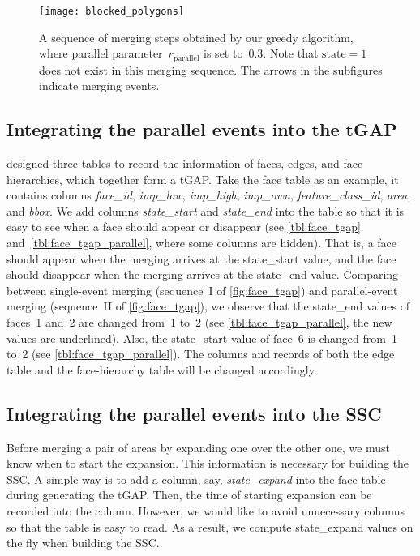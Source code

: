 \documentclass[ijgi,article,submit,moreauthors,pdftex]{Definitions/mdpi}
\begin{document}
\begin{figure}[tb]
\centering
\texttt{[image: blocked\_polygons]}
\caption{A sequence of merging steps obtained by our greedy algorithm,
	where parallel parameter~$r_\mathrm{parallel}$ is set to~$0.3$.
    Note that $\mathrm{state}=1$ does not exist in this merging sequence.
	The arrows in the subfigures indicate merging events.
}
\label{fig:sequence_greedy}
\end{figure}




\subsection{Integrating the parallel events into the tGAP}

\citet[]{Meijers2011Thesis} designed three tables 
to record the information of
faces, edges, and face hierarchies, 
which together form a tGAP.
Take the face table as an example,
it contains columns \emph{face\_id}, 
\emph{imp\_low}, \emph{imp\_high}, \emph{imp\_own},
\emph{feature\_class\_id}, \emph{area}, and \emph{bbox}.
We add columns \emph{state\_start} and \emph{state\_end} into the table 
so that it is easy to see when a face should appear or disappear 
(see \tbls\ref{tbl:face_tgap} and~\ref{tbl:face_tgap_parallel},
where some columns are hidden).
That is, a face should appear
when the merging arrives at the state\_start value,
and the face should disappear
when the merging arrives at the state\_end value.
Comparing between single-event merging 
(sequence~I of \fig\ref{fig:face_tgap})
and parallel-event merging (sequence~II of \fig\ref{fig:face_tgap}),
we observe that the state\_end values of faces~1 and~2 are changed from~1 to~2
(see \tbl\ref{tbl:face_tgap_parallel}, the new values are underlined).
Also, the state\_start value of face~6 is changed from~1 to~2
(see \tbl\ref{tbl:face_tgap_parallel}).
The columns and records of both the edge table and the face-hierarchy table 
will be changed accordingly.


\subsection{Integrating the parallel events into the SSC}

Before merging a pair of areas by expanding one over the other one,
we must know when to start the expansion.
This information is necessary for building the SSC.
A simple way is to add a column, say, \emph{state\_expand} 
into the face table during generating the tGAP.
Then, the time of starting expansion can be recorded into the column.
However, we would like to avoid unnecessary columns
so that the table is easy to read.
As a result, we compute state\_expand values on the fly 
when building the SSC.
\end{document}
